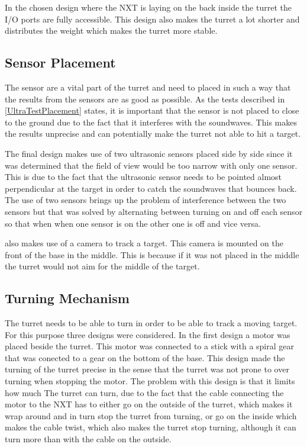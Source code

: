In the chosen design where the NXT is laying on the back inside the turret the
I/O ports are fully accessible. This design also makes the turret a lot shorter
and distributes the weight which makes the turret more stable. 

\subsection{Sensor Placement}
The sensor are a vital part of the turret and need to placed in such a way that
the results from the sensors are as good as possible. As the tests described in
\autoref{UltraTestPlacement} states, it is important that the sensor is not
placed to close to the ground due to the fact that it interferes with the
soundwaves. This makes the results unprecise and can potentially make the
turret not able to hit a target.\nl

The final design makes use of two ultrasonic sensors placed side by side since
it was determined that the field of view would be too narrow with only one
sensor. This is due to the fact that the ultrasonic sensor needs to be pointed
almost perpendicular at the target in order to catch the soundwaves that bounces
back. The use of two sensors brings up the problem of interference between the
two sensors but that was solved by alternating between turning on and off each
sensor so that when when one sensor is on the other one is off and vice
versa.\nl

\name also makes use of a camera to track a target. This camera is mounted on
the front of the base in the middle. This is because if it was not placed in the
middle the turret would not aim for the middle of the target.

\subsection{Turning Mechanism}
The turret needs to be able to turn in order to be able to track a moving
target. For this purpose three designs were considered. In the first design a
motor was placed beside the turret. This motor was connected to a stick with a
spiral gear that was conected to a gear on the bottom of the base. This design
made the turning of the turret precise in the sense that the turret was not
prone to over turning when stopping the motor. The problem with this design is
that it limits how much The turret can turn, due to the fact that the cable
connecting the motor to the NXT has to either go on the outside of the turret,
which makes it wrap around and in turn stop the turret from turning, or go on
the inside which makes the cable twist, which also makes the turret stop
turning, although it can turn more than with the cable on the outside.\nl

